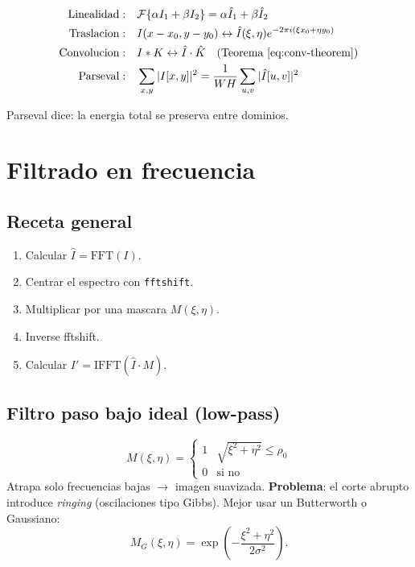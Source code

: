 \documentclass[11pt,a4paper,twoside,openright]{book}
\begin{document}
\begin{align}
\text{Linealidad}: &\quad \mathcal{F}\{\alpha I_1 + \beta I_2\} = \alpha \hat{I}_1 + \beta \hat{I}_2 \\
\text{Traslacion}: &\quad I(x-x_0, y-y_0) \leftrightarrow \hat{I}(\xi,\eta) e^{-2\pi i (\xi x_0 + \eta y_0)} \\
\text{Convolucion}: &\quad I * K \leftrightarrow \hat{I} \cdot \hat{K} \quad \text{(Teorema \ref{eq:conv-theorem})} \\
\text{Parseval}: &\quad \sum_{x,y} |I[x,y]|^2 = \frac{1}{WH}\sum_{u,v} |\hat{I}[u,v]|^2
\end{align}

Parseval dice: la energia total se preserva entre dominios.

\section{Filtrado en frecuencia}

\subsection{Receta general}

\begin{enumerate}[leftmargin=2em]
  \item Calcular $\hat{I} = \mathrm{FFT}(I)$.
  \item Centrar el espectro con \texttt{fftshift}.
  \item Multiplicar por una mascara $M(\xi,\eta)$.
  \item Inverse fftshift.
  \item Calcular $I' = \mathrm{IFFT}(\hat{I} \cdot M)$.
\end{enumerate}

\subsection{Filtro paso bajo ideal (low-pass)}

\begin{equation}
M(\xi,\eta) = \begin{cases} 1 & \sqrt{\xi^2+\eta^2} \leq \rho_0 \\ 0 & \text{si no} \end{cases}
\end{equation}
Atrapa solo frecuencias bajas $\to$ imagen suavizada. \textbf{Problema}: el corte abrupto introduce \emph{ringing} (oscilaciones tipo Gibbs). Mejor usar un Butterworth o Gaussiano:
\begin{equation}
M_G(\xi,\eta) = \exp\!\left(-\frac{\xi^2+\eta^2}{2\sigma^2}\right).
\end{equation}
\end{document}
